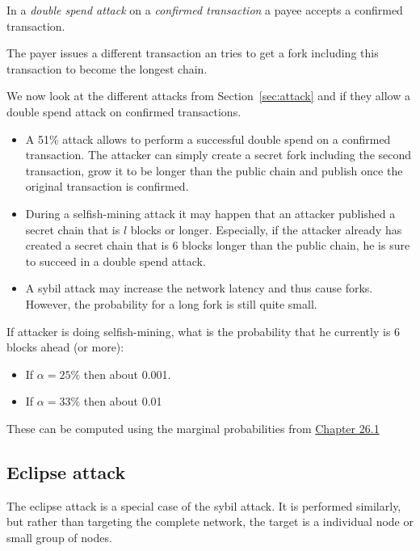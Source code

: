 \begin{definition}In a \emph{double spend attack} on a \emph{confirmed transaction} a payee accepts a confirmed transaction. 

The payer issues a different transaction an tries to get a fork including this transaction to become the longest chain.
\end{definition}

\begin{note}
We now look at the different attacks from Section~\ref{sec:attack}	and if they allow a double spend attack on confirmed transactions.
\begin{itemize}
	\item A 51\% attack allows to perform a successful double spend on a confirmed transaction. The attacker can simply create a secret fork including the second transaction, grow it to be longer than the public chain and publish once the original transaction is confirmed.
	\item During a selfish-mining attack it may happen that an attacker published a secret chain that is $l$ blocks or longer. Especially, if the attacker already has created a secret chain that is 6 blocks longer than the public chain, he is sure to succeed in a double spend attack.
	\item A sybil attack may increase the network latency and thus cause forks. However, the probability for a long fork is still quite small.
\end{itemize}
\end{note}

\begin{note}
	If attacker is doing selfish-mining, what is the probability that he currently is 6 blocks ahead (or more):
	\begin{itemize}
		\item If $\alpha=25\%$ then about 0.001.
		\item If $\alpha=33\%$ then about 0.01
	\end{itemize}
	These can be computed using the marginal probabilities from \href{https://disco.ethz.ch/courses/distsys/lnotes/chapter26.pdf}{Chapter 26.1} 
	
\end{note}


\subsection{Eclipse attack}
The eclipse attack is a special case of the sybil attack. It is performed similarly, but rather than targeting the complete network, the target is a individual node or small group of nodes.

